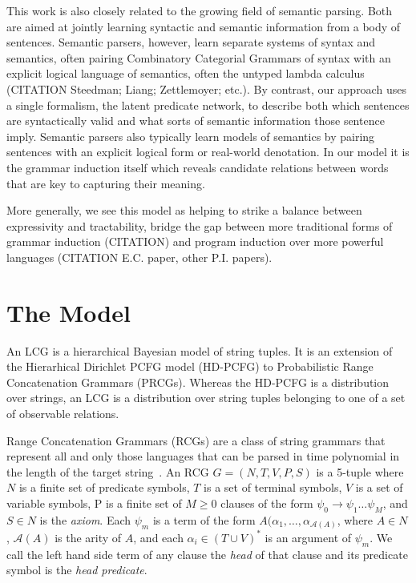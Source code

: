 \documentclass[11pt, twocolumn]{article}
\begin{document}
This work is also closely related to the growing field of semantic parsing. Both are aimed at jointly learning syntactic and semantic information from a body of sentences. Semantic parsers, however, learn separate systems of syntax and semantics, often pairing Combinatory Categorial Grammars of syntax with an explicit logical language of semantics, often the untyped lambda calculus (CITATION Steedman; Liang; Zettlemoyer; etc.). By contrast, our approach uses a single formalism, the latent predicate network, to describe both which sentences are syntactically valid and what sorts of semantic information those sentence imply. Semantic parsers also typically learn models of semantics by pairing sentences with an explicit logical form or real-world denotation. In our model it is the grammar induction itself which reveals candidate relations between words that are key to capturing their meaning.

More generally, we see this model as helping to strike a balance between expressivity and tractability, bridge the gap between more traditional forms of grammar induction (CITATION) and program induction over more powerful languages (CITATION E.C. paper, other P.I. papers).

\section{The Model}
An LCG is a hierarchical Bayesian model of string tuples. It is an
extension of the Hierarhical Dirichlet PCFG model (HD-PCFG) to
Probabilistic Range Concatenation Grammars (PRCGs). Whereas the
HD-PCFG is a distribution over strings, an LCG is a distribution over
string tuples belonging to one of a set of observable
relations. 

Range Concatenation Grammars (RCGs) are a class of string grammars
that represent all and only those languages that can be parsed in time
polynomial in the length of the target
string~\cite{boullier2005range}. An RCG $G=(N, T, V, P, S)$ is a
5-tuple where $N$ is a finite set of predicate symbols, $T$ is a set
of terminal symbols, $V$ is a set of variable symbols, P is a finite
set of $M \geq 0$ clauses of the form $\psi_0 \rightarrow \psi_1 \dots
\psi_M$, and $S \in N$ is the \emph{axiom}. Each $\psi_m$ is a term of
the form $A(\alpha_1, \dots, \alpha_{\mathcal{A}(A)}$, where $A \in
N$, $\mathcal{A}(A)$ is the arity of $A$, and each $\alpha_i \in (T
\cup V)^*$ is an argument of $\psi_m$. We call the left hand side term
of any clause the \emph{head} of that clause and its predicate symbol
is the \emph{head predicate}.
\end{document}
